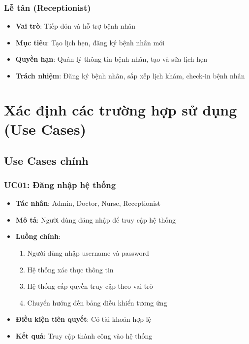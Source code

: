 \documentclass[12pt,a4paper]{report}
\begin{document}
\subsubsection{Lễ tân (Receptionist)}
\begin{itemize}
    \item \textbf{Vai trò}: Tiếp đón và hỗ trợ bệnh nhân
    \item \textbf{Mục tiêu}: Tạo lịch hẹn, đăng ký bệnh nhân mới
    \item \textbf{Quyền hạn}: Quản lý thông tin bệnh nhân, tạo và sửa lịch hẹn
    \item \textbf{Trách nhiệm}: Đăng ký bệnh nhân, sắp xếp lịch khám, check-in bệnh nhân
\end{itemize}

\section{Xác định các trường hợp sử dụng (Use Cases)}

\subsection{Use Cases chính}

\subsubsection{UC01: Đăng nhập hệ thống}
\begin{itemize}
    \item \textbf{Tác nhân}: Admin, Doctor, Nurse, Receptionist
    \item \textbf{Mô tả}: Người dùng đăng nhập để truy cập hệ thống
    \item \textbf{Luồng chính}:
    \begin{enumerate}
        \item Người dùng nhập username và password
        \item Hệ thống xác thực thông tin
        \item Hệ thống cấp quyền truy cập theo vai trò
        \item Chuyển hướng đến bảng điều khiển tương ứng
    \end{enumerate}
    \item \textbf{Điều kiện tiên quyết}: Có tài khoản hợp lệ
    \item \textbf{Kết quả}: Truy cập thành công vào hệ thống
\end{itemize}
\end{document}
